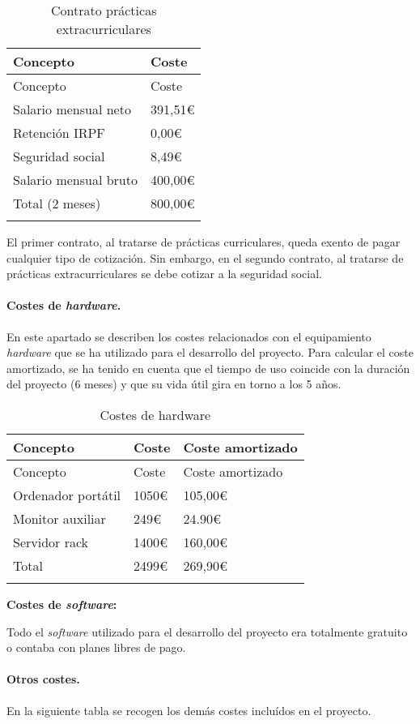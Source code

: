 \begin{longtable}[]{@{}ll@{}}
\toprule
Concepto & Coste\tabularnewline
\midrule
\endfirsthead
\toprule
Concepto & Coste\tabularnewline
\midrule
\endhead
Salario mensual neto & 391,51\euro{}\tabularnewline
Retención IRPF & 0,00\euro{}\tabularnewline
Seguridad social & 8,49\euro{}\tabularnewline
Salario mensual bruto & 400,00\euro{}\tabularnewline
Total (2 meses) & 800,00\euro{}\tabularnewline
\bottomrule
\caption{Contrato prácticas extracurriculares}
\end{longtable}

El primer contrato, al tratarse de prácticas curriculares, queda exento
de pagar cualquier tipo de cotización. Sin embargo, en el segundo
contrato, al tratarse de prácticas extracurriculares se debe cotizar a
la seguridad social.


\paragraph{Costes de \emph{hardware}.}

En este apartado se describen los costes relacionados con el
equipamiento \emph{hardware} que se ha utilizado para el desarrollo del
proyecto. Para calcular el coste amortizado, se ha tenido en cuenta que
el tiempo de uso coincide con la duración del proyecto (6 meses) y que
su vida útil gira en torno a los 5 años.

\begin{longtable}[]{@{}lll@{}}
\toprule
Concepto & Coste & Coste amortizado\tabularnewline
\midrule
\endfirsthead
\toprule
Concepto & Coste & Coste amortizado\tabularnewline
\midrule
\endhead
Ordenador portátil & 1050\euro{} & 105,00\euro{}\tabularnewline
Monitor auxiliar & 249\euro{} & 24.90\euro{}\tabularnewline
Servidor rack & 1400\euro{} & 160,00\euro{}\tabularnewline
Total & 2499\euro{} & 269,90\euro{}\tabularnewline
\bottomrule
\caption{Costes de hardware}\tabularnewline
\end{longtable}

\textbf{Costes de \emph{software}:}

Todo el \emph{software} utilizado para el desarrollo del proyecto era
totalmente gratuito o contaba con planes libres de pago.

\paragraph{Otros costes.}

En la siguiente tabla se recogen los demás costes incluídos en el
proyecto.

